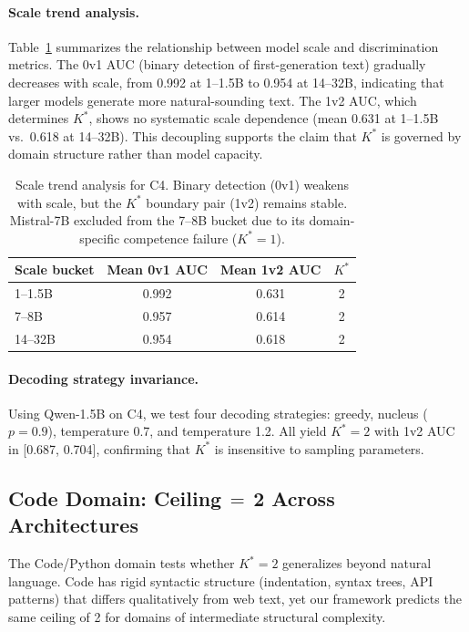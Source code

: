 \documentclass[11pt,a4paper]{article}
\newcommand{\kstar}{K^{*}}
\begin{document}
\paragraph{Scale trend analysis.}
Table~\ref{tab:scale_trend} summarizes the relationship between model scale and discrimination metrics.
The 0v1 AUC (binary detection of first-generation text) gradually decreases with scale, from 0.992 at 1--1.5B to 0.954 at 14--32B, indicating that larger models generate more natural-sounding text.
The 1v2 AUC, which determines $\kstar$, shows no systematic scale dependence (mean 0.631 at 1--1.5B vs.\ 0.618 at 14--32B).
This decoupling supports the claim that $\kstar$ is governed by domain structure rather than model capacity.

\begin{table}[t]
\centering
\caption{Scale trend analysis for C4. Binary detection (0v1) weakens with scale, but the $\kstar$ boundary pair (1v2) remains stable. Mistral-7B excluded from the 7--8B bucket due to its domain-specific competence failure ($\kstar\!=\!1$).}
\label{tab:scale_trend}
\small
\begin{tabular}{lccc}
\toprule
\textbf{Scale bucket} & \textbf{Mean 0v1 AUC} & \textbf{Mean 1v2 AUC} & $\kstar$ \\
\midrule
1--1.5B   & 0.992 & 0.631 & 2 \\
7--8B     & 0.957 & 0.614 & 2 \\
14--32B   & 0.954 & 0.618 & 2 \\
\bottomrule
\end{tabular}
\end{table}

\paragraph{Decoding strategy invariance.}
Using Qwen-1.5B on C4, we test four decoding strategies: greedy, nucleus ($p\!=\!0.9$), temperature 0.7, and temperature 1.2. All yield $\kstar\!=\!2$ with 1v2 AUC in [0.687, 0.704], confirming that $\kstar$ is insensitive to sampling parameters.

\subsection{Code Domain: Ceiling$\,=\,$2 Across Architectures}
\label{sec:code}

The Code/Python domain tests whether $\kstar\!=\!2$ generalizes beyond natural language.
Code has rigid syntactic structure (indentation, syntax trees, API patterns) that differs qualitatively from web text, yet our framework predicts the same ceiling of 2 for domains of intermediate structural complexity.
\end{document}
